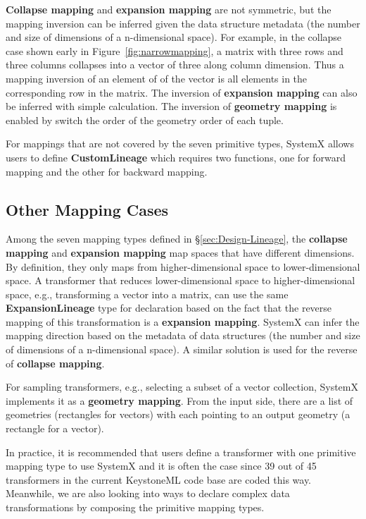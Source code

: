 \documentclass{sig-alternate}
\begin{document}
{\bf Collapse mapping} and {\bf expansion mapping} are not symmetric, but the mapping inversion can be inferred
given the data structure metadata (the number and size of dimensions of a n-dimensional space). For example, 
in the collapse case shown early in Figure~\ref{fig:narrowmapping}, a matrix with three rows and three columns
collapses into a vector of three along column dimension. Thus a mapping inversion of an element of of the vector
is all elements in the corresponding row in the matrix. 
The inversion of {\bf expansion mapping} can also be inferred with simple calculation.
The inversion of {\bf geometry mapping} is enabled by switch the order of the geometry order of each tuple.

For mappings that are not covered by the seven primitive types, SystemX allows users to define {\bf CustomLineage}
which requires two functions, one for forward mapping and the other for backward mapping.

\subsection{Other Mapping Cases}
Among the seven mapping types defined in \S\ref{sec:Design-Lineage}, the {\bf collapse mapping} and {\bf expansion mapping}
map spaces that have different dimensions. By definition, they only maps from higher-dimensional space to lower-dimensional space.
A transformer that reduces lower-dimensional space to higher-dimensional space, e.g., transforming a vector into a matrix, can use
the same {\bf ExpansionLineage} type for declaration based on the fact that the reverse mapping of this transformation is a
{\bf expansion mapping}. SystemX can infer the mapping direction based on the metadata of data structures 
(the number and size of dimensions of a n-dimensional space). 
A similar solution is used for the reverse of {\bf collapse mapping}.

For sampling transformers, e.g., selecting a subset of a vector collection, SystemX implements it as a {\bf geometry mapping}.
From the input side, there are a list of geometries (rectangles for vectors) with each pointing to an output geometry (a rectangle for a vector).

In practice, it is recommended that users define a transformer with one primitive mapping type to use SystemX and it is often the case since
39 out of 45 transformers in the current KeystoneML code base are coded this way. 
Meanwhile, we are also looking into ways to declare complex data transformations by composing the primitive mapping types.
\end{document}
